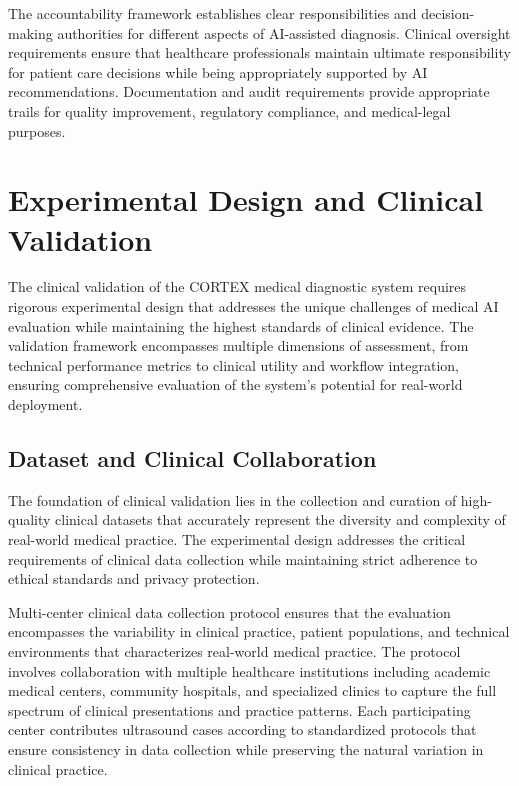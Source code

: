 The accountability framework establishes clear responsibilities and decision-making authorities for different aspects of AI-assisted diagnosis. Clinical oversight requirements ensure that healthcare professionals maintain ultimate responsibility for patient care decisions while being appropriately supported by AI recommendations. Documentation and audit requirements provide appropriate trails for quality improvement, regulatory compliance, and medical-legal purposes.

\section{Experimental Design and Clinical Validation}

The clinical validation of the CORTEX medical diagnostic system requires rigorous experimental design that addresses the unique challenges of medical AI evaluation while maintaining the highest standards of clinical evidence. The validation framework encompasses multiple dimensions of assessment, from technical performance metrics to clinical utility and workflow integration, ensuring comprehensive evaluation of the system's potential for real-world deployment.

\subsection{Dataset and Clinical Collaboration}

The foundation of clinical validation lies in the collection and curation of high-quality clinical datasets that accurately represent the diversity and complexity of real-world medical practice. The experimental design addresses the critical requirements of clinical data collection while maintaining strict adherence to ethical standards and privacy protection.

Multi-center clinical data collection protocol ensures that the evaluation encompasses the variability in clinical practice, patient populations, and technical environments that characterizes real-world medical practice. The protocol involves collaboration with multiple healthcare institutions including academic medical centers, community hospitals, and specialized clinics to capture the full spectrum of clinical presentations and practice patterns. Each participating center contributes ultrasound cases according to standardized protocols that ensure consistency in data collection while preserving the natural variation in clinical practice.

